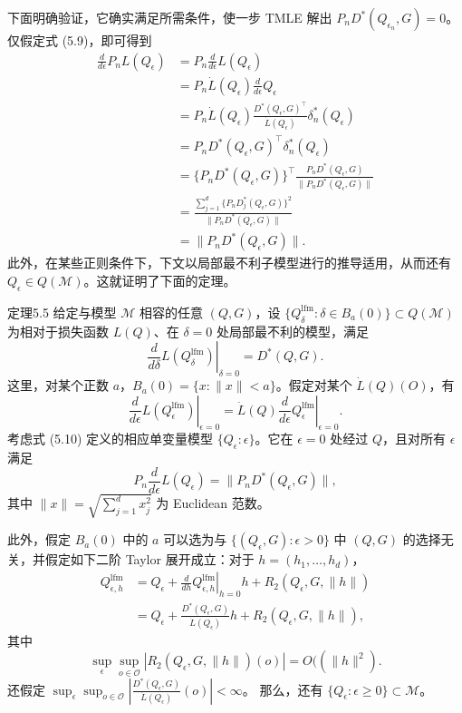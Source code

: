 下面明确验证，它确实满足所需条件，使一步 TMLE 解出
$P_nD^*(Q_{\epsilon_n},G)=0$。
仅假定式 (5.9)，即可得到
\[
 \begin{aligned}
 \frac{d}{d\epsilon}P_nL(Q_\epsilon)
 &=P_n\frac{d}{d\epsilon}L(Q_\epsilon)\\
 &=P_n\dot L(Q_\epsilon)\frac{d}{d\epsilon}Q_\epsilon\\
 &=P_n\dot L(Q_\epsilon)
 \frac{D^*(Q_\epsilon,G)^\top}{\dot L(Q_\epsilon)}
 \delta_n^*(Q_\epsilon)\\
 &=P_nD^*(Q_\epsilon,G)^\top\delta_n^*(Q_\epsilon)\\
 &=\{P_nD^*(Q_\epsilon,G)\}^\top
 \frac{P_nD^*(Q_\epsilon,G)}{\|P_nD^*(Q_\epsilon,G)\|}\\
 &=\frac{\sum_{j=1}^d\{P_nD_j^*(Q_\epsilon,G)\}^2}
 {\|P_nD^*(Q_\epsilon,G)\|}\\
 &=\|P_nD^*(Q_\epsilon,G)\|.
 \end{aligned}
\]
此外，在某些正则条件下，下文以局部最不利子模型进行的推导适用，从而还有 $Q_\epsilon\in Q(\mathcal M)$。这就证明了下面的定理。

\begin{bookresult}{定理}{5.5}
给定与模型 $\mathcal M$ 相容的任意 $(Q,G)$，设
$\{Q_\delta^{\mathrm{lfm}}:\delta\in B_a(0)\}\subset Q(\mathcal M)$
为相对于损失函数 $L(Q)$、在 $\delta=0$ 处局部最不利的模型，满足
\[
 \left.\frac{d}{d\delta}L(Q_\delta^{\mathrm{lfm}})\right|_{\delta=0}
 =D^*(Q,G).
\]
这里，对某个正数 $a$，$B_a(0)=\{x:\|x\|<a\}$。假定对某个 $\dot L(Q)(O)$，有
\[
 \left.\frac{d}{d\epsilon}L(Q_\epsilon^{\mathrm{lfm}})\right|_{\epsilon=0}
 =\dot L(Q)
 \left.\frac{d}{d\epsilon}Q_\epsilon^{\mathrm{lfm}}\right|_{\epsilon=0}.
\]
考虑式 (5.10) 定义的相应单变量模型 $\{Q_\epsilon:\epsilon\}$。它在 $\epsilon=0$ 处经过 $Q$，且对所有 $\epsilon$ 满足
\begin{equation}
 P_n\frac{d}{d\epsilon}L(Q_\epsilon)=\|P_nD^*(Q_\epsilon,G)\|,
 \tag{5.11}
\end{equation}
其中 $\|x\|=\sqrt{\sum_{j=1}^d x_j^2}$ 为 Euclidean 范数。

此外，假定 $B_a(0)$ 中的 $a$ 可以选为与
$\{(Q_\epsilon,G):\epsilon>0\}$ 中 $(Q,G)$ 的选择无关，并假定如下二阶 Taylor 展开成立：对于 $h=(h_1,\ldots,h_d)$，
\[
 \begin{aligned}
 Q_{\epsilon,h}^{\mathrm{lfm}}
 &=Q_\epsilon+
 \left.\frac{d}{dh}Q_{\epsilon,h}^{\mathrm{lfm}}\right|_{h=0}
 h+R_2(Q_\epsilon,G,\|h\|)\\
 &=Q_\epsilon+\frac{D^*(Q_\epsilon,G)}{\dot L(Q_\epsilon)}
 h+R_2(Q_\epsilon,G,\|h\|),
 \end{aligned}
\]
其中
\[
 \sup_\epsilon\sup_{o\in\mathcal O}
 |R_2(Q_\epsilon,G,\|h\|)(o)|=O((\|h\|^2).
\]
还假定
$\sup_\epsilon\sup_{o\in\mathcal O}
 \left|\frac{D^*(Q_\epsilon,G)}{\dot L(Q_\epsilon)}(o)\right|<\infty$。
那么，还有 $\{Q_\epsilon:\epsilon\geq0\}\subset\mathcal M$。
\end{bookresult}
